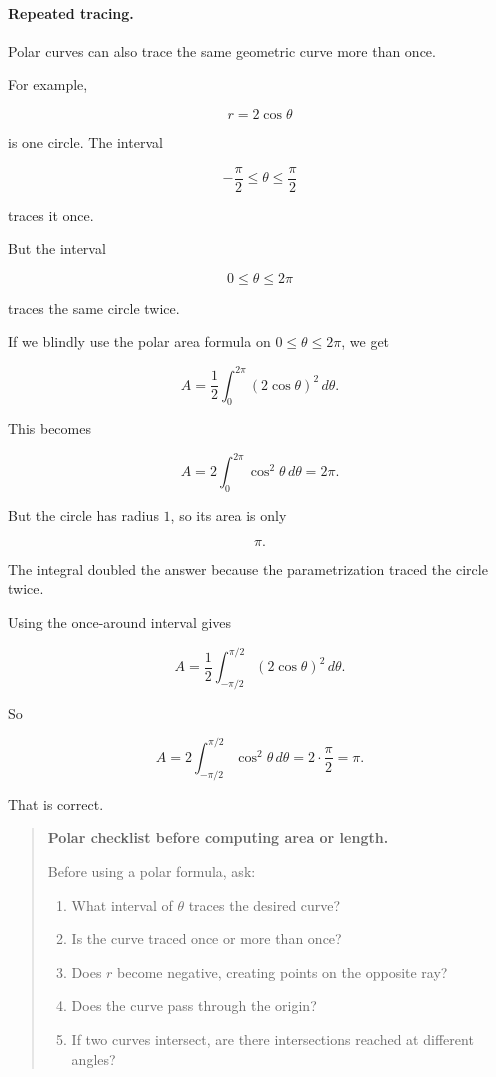 \paragraph{Repeated tracing.}
Polar curves can also trace the same geometric curve more than once.

For example,

\[
r=2\cos\theta
\]

is one circle.  The interval

\[
-\frac{\pi}{2}\le\theta\le\frac{\pi}{2}
\]

traces it once.

But the interval

\[
0\le\theta\le2\pi
\]

traces the same circle twice.

If we blindly use the polar area formula on \(0\le\theta\le2\pi\), we get

\[
A=\frac12\int_0^{2\pi}(2\cos\theta)^2\,d\theta.
\]

This becomes

\[
A=2\int_0^{2\pi}\cos^2\theta\,d\theta
=
2\pi.
\]

But the circle has radius \(1\), so its area is only

\[
\pi.
\]

The integral doubled the answer because the parametrization traced the circle twice.

Using the once-around interval gives

\[
A=\frac12\int_{-\pi/2}^{\pi/2}(2\cos\theta)^2\,d\theta.
\]

So

\[
A=2\int_{-\pi/2}^{\pi/2}\cos^2\theta\,d\theta
=
2\cdot\frac{\pi}{2}
=
\pi.
\]

That is correct.

\begin{quote}
\textbf{Polar checklist before computing area or length.}

Before using a polar formula, ask:

\begin{enumerate}
\item What interval of \(\theta\) traces the desired curve?

\item Is the curve traced once or more than once?

\item Does \(r\) become negative, creating points on the opposite ray?

\item Does the curve pass through the origin?

\item If two curves intersect, are there intersections reached at different angles?
\end{enumerate}
\end{quote}

